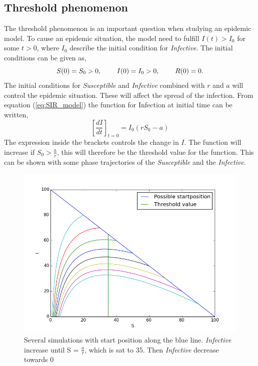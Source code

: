 \documentclass[%
twoside,                 %
final,                   %
10pt]{article}
\begin{document}
\subsection{Threshold phenomenon}
The threshold phenomenon is an important question when studying an epidemic model. To cause an epidemic situation, the model need to fulfill $I(t)> I_0$ for some $t>0$, where $I_0$ describe the initial condition for \emph{Infective}. The initial conditions can be given as,
\begin{equation}
S(0)=S_0 > 0,\hspace{8mm} I(0)=I_0>0,\hspace{8mm} R(0) =0.
\end{equation}
The initial conditions for \emph{Susceptible} and \emph{Infective} combined with $r$ and $a$ will control the epidemic situation. These will affect the spread of the infection. From equation (\ref{eq:SIR_model}) the function for Infection at initial time can be written,
\begin{equation}
\left[\frac{dI}{dt}\right]_{t=0} = I_0(rS_0-a)
\end{equation}
The expression inside the brackets controls the change in $I$. The function will increase if $S_0 > \frac{a}{r}$, this will therefore be the threshold value for the function. This can be shown with some phase trajectories of the \emph{Susceptible} and the \emph{Infective}.  


\begin{figure}[ht]
  \centerline{\includegraphics[width=0.9\linewidth]{plots/threshold_phenomenon.png}}
  \caption{
  \label{fig:threshold_phenomenon} Several simulations with start position along the blue line. \emph{Infective} increase until S = $\frac{a}{r}$, which is sat to 35. Then \emph{Infective} decrease towards 0
  }
\end{figure}
\end{document}
